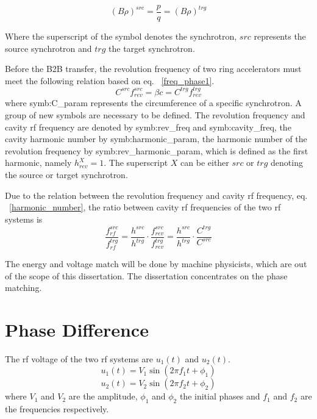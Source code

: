 \begin{equation}
	\label{eq:rigidity}
	(B\rho)^{\mathit{src}} =\frac{p}{q}=(B\rho)^{\mathit{trg}}
\end{equation}

Where the superscript of the symbol denotes the synchrotron, $\mathit{src}$ represents the source synchrotron and $\mathit{trg}$ the target synchrotron. 

Before the B2B transfer, the revolution frequency of two ring accelerators must meet the following relation based on eq. ~\ref{freq_phase1}. 
\begin{equation}
	C^{\mathit{src}}f_{rev}^{\mathit{src}} = \beta c=C^{\mathit{trg}}f_{rev}^{\mathit{trg}}
\end{equation}
where \gls{symb:C_param} represents the circumference of a specific synchrotron. A group of new symbols are necessary to be defined. The revolution frequency and cavity rf frequency are denoted by \gls{symb:rev_freq} and \gls{symb:cavity_freq}, the cavity harmonic number by \gls{symb:harmonic_param}, the harmonic number of the revolution frequency by \gls{symb:rev_harmonic_param}, which is defined as the first harmonic, namely $h_\mathit{rev}^\mathit{X}=1$. The superscript $X$ can be either $src$ or $trg$ denoting the source or target synchrotron. 

Due to the relation between the revolution frequency and cavity rf frequency, eq. ~\ref{harmonic_number}, the ratio between cavity rf frequencies of the two rf systems is
\begin{equation}
	\frac{f_{rf}^{\mathit{src}}}{f_{rf}^{\mathit{trg}}}=\frac{h^{\mathit{src}}}{h^{\mathit{trg}}}\cdot\frac{f_{rev}^{\mathit{src}}}{f_{rev}^{\mathit{trg}}}=\frac{h^{\mathit{src}}}{h^{\mathit{trg}}}\cdot \frac{C^{\mathit{trg}}}{C^{\mathit{src}}}
\end{equation}

The energy and voltage match will be done by machine physicists, which are out of the scope of this dissertation. The dissertation concentrates on the phase matching.
\section{Phase Difference}
\label{match}
The rf voltage of the two rf systems are $u_1(t)$ and $u_2(t)$.
\begin{equation}
\label{rf_freq1}
	u_1(t)=V_1\sin(2\pi f_1t+\phi_1)
\end{equation}
\begin{equation}
\label{rf_freq2}
	u_2(t)=V_2\sin(2\pi f_2t+\phi_2)
\end{equation}
where $V_1$ and $V_2$ are the amplitude, $\phi_1$ and $\phi_2$ the initial phases and $f_1$ and $f_2$ are the frequencies respectively. 


